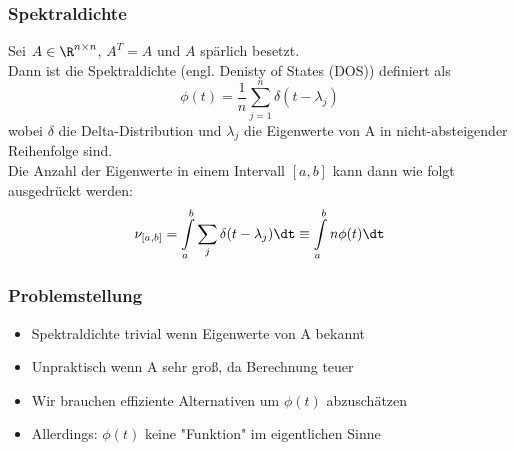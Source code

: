 
\begin{frame}
    \frametitle{Spektraldichte}
    Sei $A \in \R^{n \times n}$, $A^T = A$ und $A$ spärlich besetzt.\\
    Dann ist die Spektraldichte (engl. Denisty of States (DOS)) definiert als 
    \begin{equation}
        \phi(t) = \frac{1}{n} \sum_{j=1}^{n} \delta(t - \lambda_j)
    \end{equation}
    wobei $\delta$ die Delta-Distribution und $\lambda_j$ die Eigenwerte von A in nicht-absteigender Reihenfolge sind.\\
    Die Anzahl der Eigenwerte in einem Intervall $[a, b]$ kann dann wie folgt ausgedrückt werden:
    \begin{equation} \label{eq:nuab}
        \nu_{[a, b]} = \int\limits_a^b \sum_j \delta(t - \lambda_j) \dt \equiv \int\limits_a^b n \phi(t) \dt
    \end{equation}
\end{frame}

\begin{frame}
    \frametitle{Problemstellung}
    \begin{itemize}
        \item Spektraldichte trivial wenn Eigenwerte von A bekannt
        \item Unpraktisch wenn A sehr groß, da Berechnung teuer
        \item Wir brauchen effiziente Alternativen um $\phi(t)$ abzuschätzen
        \item Allerdings: $\phi(t)$ keine "Funktion" im eigentlichen Sinne
    \end{itemize}
\end{frame}

